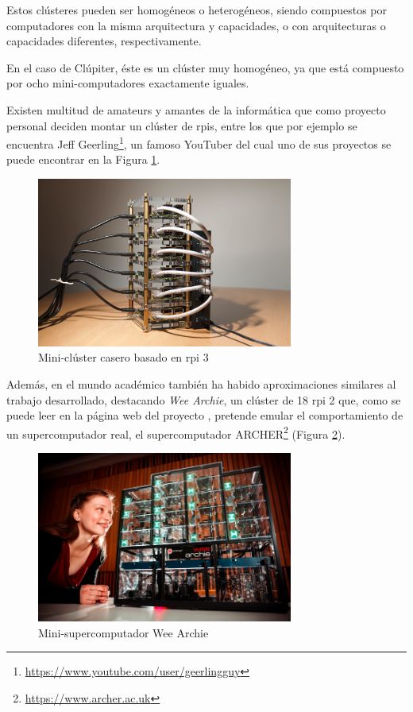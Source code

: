 Estos clústeres pueden ser homogéneos o heterogéneos, siendo compuestos por computadores con la misma arquitectura y capacidades, o con arquitecturas o capacidades diferentes, respectivamente.

En el caso de Clúpiter, éste es un clúster muy homogéneo, ya que está compuesto por ocho mini-computadores exactamente iguales.

Existen multitud de amateurs y amantes de la informática que como proyecto personal deciden montar un clúster de \acrlong{rpi}s, entre los que por ejemplo se encuentra Jeff Geerling\footnote{\url{https://www.youtube.com/user/geerlingguy}}, un famoso YouTuber del cual uno de sus proyectos se puede encontrar en la Figura \ref{fig:cluster-pi-ejemplo}.

\begin{figure}[h!]
  \centering
  \includegraphics[width=0.75\textwidth]{img/cluster-pi-home.png}
  \caption{Mini-clúster casero basado en \acrlong{rpi} 3\cite{geerling_intro_cluster}}
  \label{fig:cluster-pi-ejemplo}
\end{figure}

Además, en el mundo académico también ha habido aproximaciones similares al trabajo desarrollado, destacando \textit{Wee Archie}, un clúster de 18 \acrlong{rpi} 2 que, como se puede leer en la página web del proyecto \cite{wee_archie_webpage}, pretende emular el comportamiento de un supercomputador real, el supercomputador ARCHER\footnote{\url{https://www.archer.ac.uk}} (Figura \ref{fig:wee_archie_girl}).

\begin{figure}[h!]
  \centering
  \includegraphics[width=0.75\textwidth]{img/wee-girl.jpg}
  \caption{Mini-supercomputador Wee Archie}
  \label{fig:wee_archie_girl}
\end{figure}

